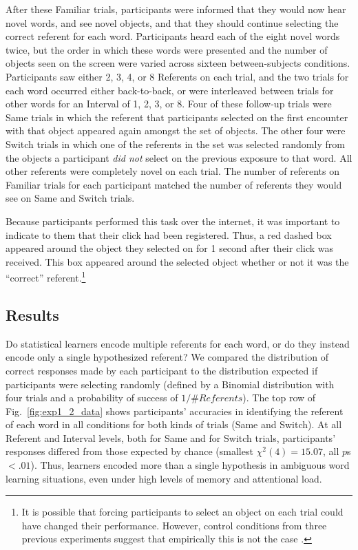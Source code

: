 \documentclass[man,floatsintext]{apa6}
\begin{document}
After these Familiar trials, participants were informed that they would now hear novel words, and see novel objects, and that they should continue selecting the correct referent for each word. Participants heard each of the eight novel words twice, but the order in which these words were presented and the number of objects seen on the screen were varied across sixteen between-subjects conditions. Participants saw either 2, 3, 4, or 8 Referents on each trial, and the two trials for each word occurred either back-to-back, or were interleaved between trials for other words for an Interval of 1, 2, 3, or 8. Four of these follow-up trials were Same trials in which the referent that participants selected on the first encounter with that object appeared again amongst the set of objects. The other four were Switch trials in which one of the referents in the set was selected randomly from the objects a participant \emph{did not} select on the previous exposure to that word. All other referents were completely novel on each trial. The number of referents on Familiar trials for each participant matched the number of referents they would see on Same and Switch trials.

Because participants performed this task over the internet, it was important to indicate to them that their click had been registered. Thus, a red dashed box appeared around the object they selected on for 1 second after their click was received. This box appeared around the selected object whether or not it was the ``correct'' referent.\footnote{It is possible that forcing participants to select an object on each trial could have changed their performance. However, control conditions from three previous experiments suggest that empirically this is not the case \cite{Medina2011, Smith2011a, Trueswell2013}.}

\subsection{Results}

Do statistical learners encode multiple referents for each word, or do they instead encode only a single hypothesized referent? We compared the distribution of correct responses made by each participant to the distribution expected if participants were selecting randomly (defined by a Binomial distribution with four trials and a probability of success of  $1/\# Referents$). The top row of Fig.~\ref{fig:exp1_2_data} shows participants' accuracies in identifying the referent of each word in all conditions for both kinds of trials (Same and Switch). At all Referent and Interval levels, both for Same and for Switch trials, participants' responses differed from those expected by chance (smallest $\chi^{2}(4) = 15.07$, all $p$s $< .01$). Thus, learners encoded more than a single hypothesis in ambiguous word learning situations, even under high levels of memory and attentional load. 
\end{document}
